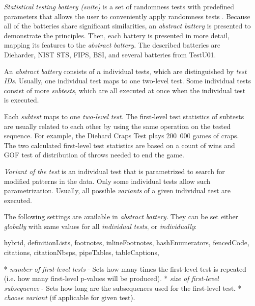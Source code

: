 \documentclass[
  digital,     %
  oneside,     %
  nosansbold,  %
  nocolorbold, %
  nolof,         %
  nolot,         %
]{fithesis4}
\begin{document}

\emph{Statistical testing battery (suite)} is a set of randomness tests with predefined parameters that allows the user to conveniently apply randomness tests \cite[p. 5]{tu01_guide}. Because all of the batteries share significant similarities, an \emph{abstract battery} is presented to demonstrate the principles. Then, each battery is presented in more detail, mapping its features to the \emph{abstract battery}. The described batteries are Dieharder, NIST STS, FIPS, BSI, and several batteries from TestU01.


An \emph{abstract battery} consists of $n$ individual tests, which are distinguished by \emph{test IDs}. Usually, one individual test maps to one two-level test. Some individual tests consist of more \emph{subtests}, which are all executed at once when the individual test is executed.

Each \emph{subtest} maps to one \emph{two-level test}. The first-level test statistics of subtests are usually related to each other by using the same operation on the tested sequence. For example, the Diehard Craps Test \cite{dieharder_orig} plays 200~000 games of craps. The two calculated first-level test statistics are based on a count of wins and GOF test of distribution of throws needed to end the game. 

\emph{Variant of the test} is an individual test that is parametrized to search for modified patterns in the data. Only some individual tests allow such parametrization. Usually, all possible \emph{variants} of a given individual test are executed.  \cite[p. 2]{vavercak}

The following settings are available in \emph{abstract battery}. They can be set either \emph{globally} with same values for all \emph{individual tests}, or \emph{individually}:
\begin{markdown*}{%
  hybrid,
  definitionLists,
  footnotes,
  inlineFootnotes,
  hashEnumerators,
  fencedCode,
  citations,
  citationNbsps,
  pipeTables,
  tableCaptions,
}

* \emph{number of first-level tests} - Sets how many times the first-level test is repeated (i.e. how many first-level p-values will be produced).
* \emph{size of first-level subsequence} - Sets how long are the subsequences used for the first-level test.
* \emph{choose variant} (if applicable for given test).


\end{markdown*}
\end{document}
